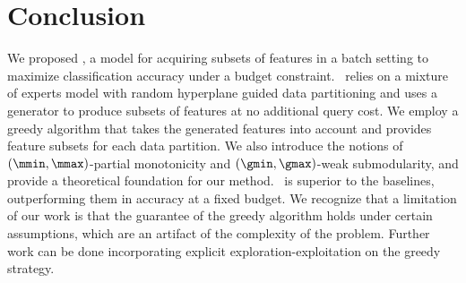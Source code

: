 \documentclass[letterpaper]{article}
\begin{document}





\section{Conclusion}
We proposed \our, a model for acquiring subsets of features in a batch setting to maximize classification accuracy under a budget constraint. \our\ relies on a mixture of experts model with random hyperplane guided data partitioning and uses a generator to produce subsets of features at no additional query cost. We employ a greedy algorithm that takes the generated features into account and provides feature subsets for each data partition. We also introduce the notions of $(\mmin, \mmax)$-partial monotonicity and $(\gmin, \gmax)$-weak submodularity, and provide a theoretical foundation for our method. \our\ is superior to the baselines, outperforming them in accuracy at a fixed budget. We recognize that a limitation of our work is that the guarantee of the greedy algorithm holds under certain assumptions, which are an artifact of the complexity of the problem.
Further work can be done incorporating explicit exploration-exploitation on the greedy strategy.
\end{document}
